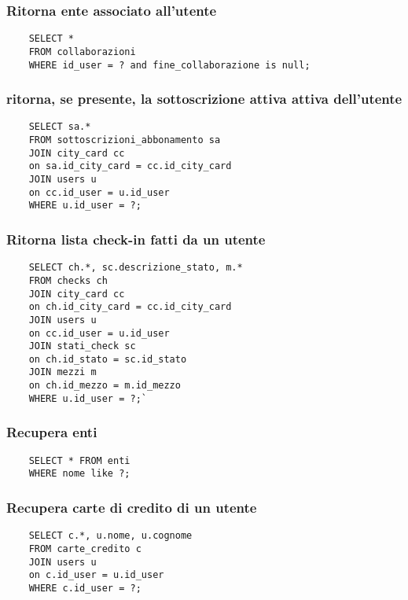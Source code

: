 \subsubsection{Ritorna ente associato all'utente}
\begin{lstlisting}
    SELECT *
    FROM collaborazioni
    WHERE id_user = ? and fine_collaborazione is null;
\end{lstlisting}


\subsubsection{ritorna, se presente, la sottoscrizione attiva attiva dell'utente}
\begin{lstlisting}
    SELECT sa.* 
    FROM sottoscrizioni_abbonamento sa
    JOIN city_card cc
    on sa.id_city_card = cc.id_city_card
    JOIN users u
    on cc.id_user = u.id_user
    WHERE u.id_user = ?;
\end{lstlisting}


\subsubsection{Ritorna lista check-in fatti da un utente}
\begin{lstlisting}
    SELECT ch.*, sc.descrizione_stato, m.*
    FROM checks ch
    JOIN city_card cc
    on ch.id_city_card = cc.id_city_card
    JOIN users u
    on cc.id_user = u.id_user
    JOIN stati_check sc
    on ch.id_stato = sc.id_stato
    JOIN mezzi m
    on ch.id_mezzo = m.id_mezzo
    WHERE u.id_user = ?;`
\end{lstlisting}


\subsubsection{Recupera enti}
\begin{lstlisting}
    SELECT * FROM enti
    WHERE nome like ?;
\end{lstlisting}




\subsubsection{Recupera carte di credito di un utente}
\begin{lstlisting}
    SELECT c.*, u.nome, u.cognome
    FROM carte_credito c
    JOIN users u
    on c.id_user = u.id_user
    WHERE c.id_user = ?;
\end{lstlisting}


